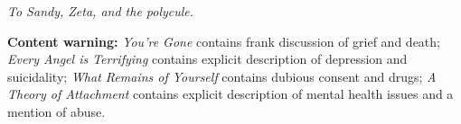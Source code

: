 \null

\vfill

\begin{flushright}
    \emph{To Sandy, Zeta, and the polycule.}
\end{flushright}

\vfill

\noindent \textbf{Content warning:} \emph{You're Gone} contains frank discussion of grief and death; \emph{Every Angel is Terrifying} contains explicit description of depression and suicidality; \emph{What Remains of Yourself} contains dubious consent and drugs; \emph{A Theory of Attachment} contains explicit description of mental health issues and a mention of abuse.
